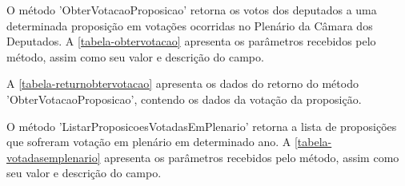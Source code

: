 \documentclass[
	12pt,				%
	openright,			%
	twoside,			%
	a4paper,			%
	english,			%
	french,				%
	spanish,			%
	brazil				%
	]{abntex2}
\begin{document}
O método ’ObterVotacaoProposicao’ retorna os votos dos deputados a uma determinada proposição em votações ocorridas no Plenário da Câmara dos Deputados. A \autoref{tabela-obtervotacao} apresenta os parâmetros recebidos pelo método, assim
como seu valor e descrição do campo.

\begin{table}[htb]
\end{table}

A \autoref{tabela-returnobtervotacao} apresenta os dados do retorno do método ’ObterVotacaoProposicao’, contendo os dados da votação da proposição.

\begin{table}[htb]
\end{table}

O método ’ListarProposicoesVotadasEmPlenario’ retorna a lista de proposições que sofreram votação em plenário em determinado ano. A \autoref{tabela-votadasemplenario} apresenta os parâmetros recebidos pelo método, assim
como seu valor e descrição do campo.
\end{document}

